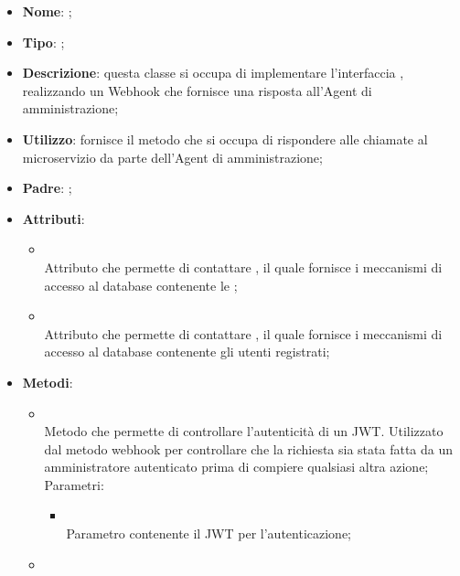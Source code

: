 \begin{itemize}
	\item \textbf{Nome}: ;
	\item \textbf{Tipo}: ;
	\item \textbf{Descrizione}: questa classe si occupa di implementare l'interfaccia , realizzando un Webhook che fornisce una risposta all'Agent di amministrazione;
	\item \textbf{Utilizzo}: fornisce il metodo che si occupa di rispondere alle chiamate al microservizio da parte dell'Agent di amministrazione;
	\item \textbf{Padre}: ;
	\item \textbf{Attributi}:
	\begin{itemize}
		\item[]  \\
		Attributo che permette di contattare , il quale fornisce i meccanismi di accesso al database contenente le ;
		\item[]  \\
		Attributo che permette di contattare , il quale fornisce i meccanismi di accesso al database contenente gli utenti registrati;
	\end{itemize}
	\item \textbf{Metodi}:
	\begin{itemize}
		\item[]  \\
		Metodo che permette di controllare l'autenticità di un JWT. Utilizzato dal metodo webhook per controllare che la richiesta sia stata fatta da un amministratore autenticato prima di compiere qualsiasi altra azione;\\
		Parametri:
		\begin{itemize}
			\item {} \\
			Parametro contenente il JWT per l'autenticazione;
		\end{itemize}
		\item[]  \\

\end{itemize}
\end{itemize}
